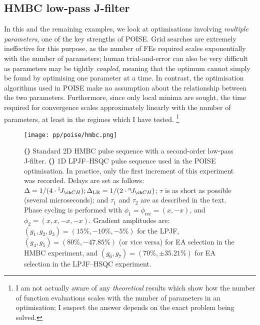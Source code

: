 \subsection{HMBC low-pass J-filter}
\label{subsec:poise__hmbc}

In this and the remaining examples, we look at optimisations involving \textit{multiple parameters}, one of the key strengths of POISE.
Grid searches are extremely ineffective for this purpose, as the number of FEs required scales exponentially with the number of parameters; human trial-and-error can also be very difficult as parameters may be tightly \textit{coupled}, meaning that the optimum cannot simply be found by optimising one parameter at a time.
In contrast, the optimisation algorithms used in POISE make no assumption about the relationship between the two parameters.
Furthermore, since only local minima are sought, the time required for convergence scales approximately linearly with the number of parameters, at least in the regimes which I have tested.%
\footnote{I am not actually aware of any \textit{theoretical} results which show how the number of function evaluations scales with the number of parameters in an optimisation; I suspect the answer depends on the exact problem being solved.}

\begin{figure}[htb]
    \centering
    \texttt{[image: pp/poise/hmbc.png]}
    {\label{fig:poise_hmbc_pulseq_hmbc}}
    {\label{fig:poise_hmbc_pulseq_hsqc}}
    \caption[Pulse sequences used for POISE HMBC optimisation]{
        \textbf{()} Standard 2D HMBC pulse sequence with a second-order low-pass J-filter.
        \textbf{()} 1D LPJF--HSQC pulse sequence used in the POISE optimisation.
        In practice, only the first increment of this experiment was recorded.
        Delays are set as follows: $\Delta = 1 / (4 \cdot \oneJ{CH}); \Delta_\text{LR} = 1 / (2 \cdot \nJ{CH})$; $\tau$ is as short as possible (several microseconds); and $\tau_1$ and $\tau_2$ are as described in the text.
        Phase cycling is performed with $\phi_1 = \phi_\text{rec} = (x, -x)$, and $\phi_2 = (x, x, -x, -x)$.
        Gradient amplitudes are: $(g_1, g_2, g_3) = (15\%, -10\%, -5\%)$ for the LPJF, $(g_4, g_5) = (80\%, -47.85\%)$ (or vice versa) for EA selection in the HMBC experiment\autocite{Cicero2001JMR}, and $(g_6, g_7) = (70\%, \pm 35.21\%)$ for EA selection in the LPJF--HSQC experiment.
    }
    \label{fig:poise_hmbc_pulseq}
\end{figure}

